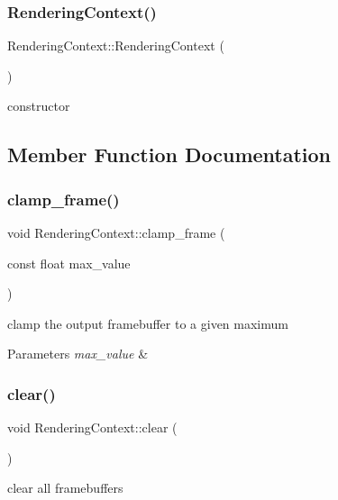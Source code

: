 \subsubsection{\texorpdfstring{Rendering\+Context()}{RenderingContext()}}
{\footnotesize\ttfamily Rendering\+Context\+::\+Rendering\+Context (\begin{DoxyParamCaption}{ }\end{DoxyParamCaption})}

constructor 

\subsection{Member Function Documentation}
\mbox{\label{struct_rendering_context_a922edc5d94bd8501da3096b649cd1231}} 
\subsubsection{\texorpdfstring{clamp\+\_\+frame()}{clamp\_frame()}}
{\footnotesize\ttfamily void Rendering\+Context\+::clamp\+\_\+frame (\begin{DoxyParamCaption}\item[{const float}]{max\+\_\+value }\end{DoxyParamCaption})}

clamp the output framebuffer to a given maximum


\begin{DoxyParams}{Parameters}
{\em max\+\_\+value} & \\
\hline
\end{DoxyParams}
\mbox{\label{struct_rendering_context_ac2b7bdb2a0291e653e19fc6ea1e40974}} 
\subsubsection{\texorpdfstring{clear()}{clear()}}
{\footnotesize\ttfamily void Rendering\+Context\+::clear (\begin{DoxyParamCaption}{ }\end{DoxyParamCaption})}

clear all framebuffers \mbox{\label{struct_rendering_context_acb44a2881eb6cf851f53428705a3351f}} 
